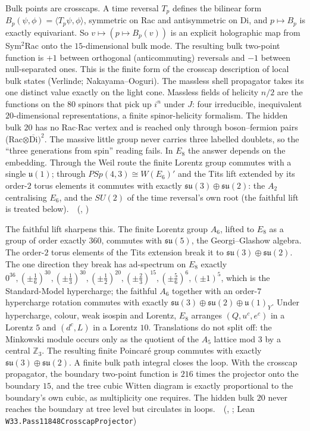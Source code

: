 Bulk points are crosscaps. A time reversal $T_p$ defines the bilinear form $B_p(\psi,\phi)=\langle T_p\psi,\phi\rangle$, symmetric on
Rac and antisymmetric on Di, and $p\mapsto B_p$ is exactly equivariant. So $v\mapsto(p\mapsto B_p(v))$ is an explicit
holographic map from Sym$^2$Rac onto the $15$-dimensional bulk mode. The resulting bulk two-point function is $+1$ between
orthogonal (anticommuting) reversals and $-1$ between null-separated ones. This is the finite form of the crosscap
description of local bulk states (Verlinde; Nakayama--Ooguri). The massless shell propagator takes its one distinct value
exactly on the light cone. Massless fields of helicity $n/2$ are the functions on the $80$ spinors that pick up $i^n$
under $J$: four irreducible, inequivalent $20$-dimensional representations, a finite spinor-helicity formalism. The hidden
bulk $20$ has no Rac$\cdot$Rac vertex and is reached only through boson--fermion pairs (Rac$\otimes\overline{\mathrm{Di}})^2$.
The massive little group never carries three labelled doublets, so the ``three generations from spin'' reading fails. In
$E_8$ the answer depends on the embedding. Through the Weil route the finite Lorentz group commutes with a single
$\mathfrak u(1)$; through $PSp(4,3)\cong W(E_6)'$ and the Tits lift extended by its order-$2$ torus elements it commutes
with exactly $\mathfrak{su}(3)\oplus\mathfrak{su}(2)$: the $A_2$ centralising $E_6$, and the $SU(2)$ of the time reversal's own
root (the faithful lift is treated below).
\tierT\,\tierC\ (, )

The faithful lift sharpens this. The finite Lorentz group $A_6$, lifted to $E_8$ as a group of order exactly $360$,
commutes with $\mathfrak{su}(5)$, the Georgi--Glashow algebra. The order-$2$ torus elements of the Tits extension break it to
$\mathfrak{su}(3)\oplus\mathfrak{su}(2)$. The one direction they break has ad-spectrum on $E_8$ exactly
$0^{36},(\pm\frac16)^{30},(\pm\frac13)^{30},(\pm\frac12)^{20},(\pm\frac23)^{15},(\pm\frac56)^{6},(\pm1)^{5}$, which is the Standard-Model
hypercharge; the faithful $A_6$ together with an order-$7$ hypercharge rotation commutes with exactly $\mathfrak{su}(3)\oplus\mathfrak{su}(2)\oplus\mathfrak u(1)_Y$. Under hypercharge, colour, weak isospin and Lorentz, $E_8$ arranges $(Q,u^c,e^c)$ in a Lorentz $5$ and $(d^c,L)$ in a
Lorentz $10$. Translations do not split off: the Minkowski module occurs only as the quotient of the $A_5$ lattice mod $3$ by a
central $\mathbb Z_3$. The resulting finite Poincar\'e group commutes with exactly $\mathfrak{su}(3)\oplus\mathfrak{su}(2)$. A finite
bulk path integral closes the loop. With the crosscap propagator, the boundary two-point function is $216$ times the projector
onto the boundary $15$, and the tree cubic Witten diagram is exactly proportional to the boundary's own cubic, as multiplicity one
requires. The hidden bulk $20$ never reaches the boundary at tree level but circulates in loops.
\tierT\,\tierC\ (, ; Lean \texttt{W33.Pass11848CrosscapProjector})

